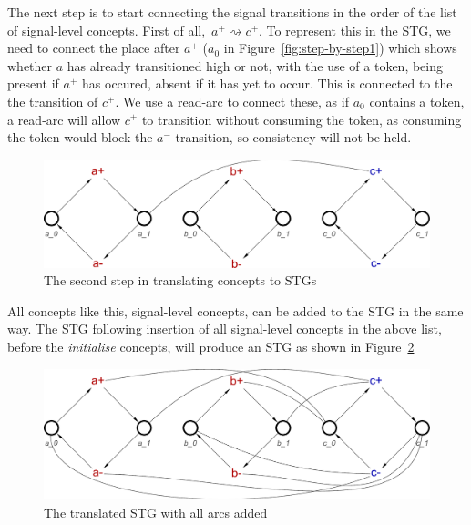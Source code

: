 \documentclass[british,compsoc]{IEEEtran}
\begin{document}
The next step is to start connecting the signal transitions in the order of the list of signal-level concepts. First of all, $\,a^{+}\rightsquigarrow c^{+}$. To represent this
in the STG, we need to connect the place after $a^{+}$ ($a_0$ in Figure~\ref{fig:step-by-step1}) which shows whether $a$ has already transitioned high or not, with the use of a
token, being present if $a^{+}$ has occured, absent if it has yet to occur. This is connected to the the transition of $c^{+}$. We use a read-arc to connect these, as if $a_0$ contains
a token, a read-arc will allow $c^{+}$ to transition without consuming the token, as consuming the token would block the $a^{-}$ transition, so consistency will not be held.

\begin{figure}[h]
\begin{centering}
\includegraphics[scale=0.23]{Images/Step-by-step2}
\par\end{centering}

\begin{centering}
\protect\caption{\label{fig:step-by-step2}The second step in translating concepts to STGs}

\par\end{centering}

\end{figure}

All concepts like this, signal-level concepts, can be added to the STG in the same way. The STG following insertion of all signal-level concepts in the above list, before the \emph{initialise} concepts, will produce an STG as
shown in Figure~\ref{fig:step-by-step9}

\begin{figure}[h]
\begin{centering}
\includegraphics[scale=0.23]{Images/Step-by-step9}
\par\end{centering}

\begin{centering}
\protect\caption{\label{fig:step-by-step9}The translated STG with all arcs added}

\par\end{centering}

\end{figure}
\end{document}
